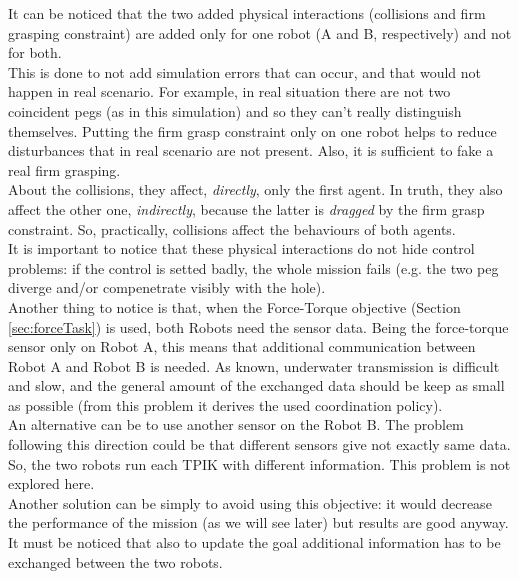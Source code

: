 \vspace{20px}
It can be noticed that the two added physical interactions (collisions and firm grasping constraint) are added only for one robot (A and B, respectively) and not for both.\\
This is done to not add simulation errors that can occur, and that would not happen in real scenario. For example, in real situation there are not two coincident pegs (as in this simulation) and so they can't really distinguish themselves. Putting the firm grasp constraint only on one robot helps to reduce disturbances that in real scenario are not present. Also, it is sufficient to fake a real firm grasping.\\
About the collisions, they affect, \textit{directly}, only the first agent. In truth, they also affect the other one, \textit{indirectly}, because the latter is \textit{dragged} by the firm grasp constraint. So, practically, collisions affect the behaviours of both agents.\\
It is important to notice that these physical interactions do not hide control problems: if the control is setted badly, the whole mission fails (e.g. the two peg diverge and/or compenetrate visibly with the hole).\\
Another thing to notice is that, when the Force-Torque objective (Section \ref{sec:forceTask}) is used, both Robots need the sensor data. Being the force-torque sensor only on Robot A, this means that additional communication between Robot A and Robot B is needed. As known, underwater transmission is difficult and slow, and the general amount of the exchanged data should be keep as small as possible (from this problem it derives the used coordination policy).\\ 
An alternative can be to use another sensor on the Robot B. The problem following this direction could be that different sensors give not exactly same data. So, the two robots run each TPIK with different information. This problem is not explored here.\\
Another solution can be simply to avoid using this objective: it would decrease the performance of the mission (as we will see later) but results are good anyway.\\
It must be noticed that also to update the goal additional information has to be exchanged between the two robots. 

